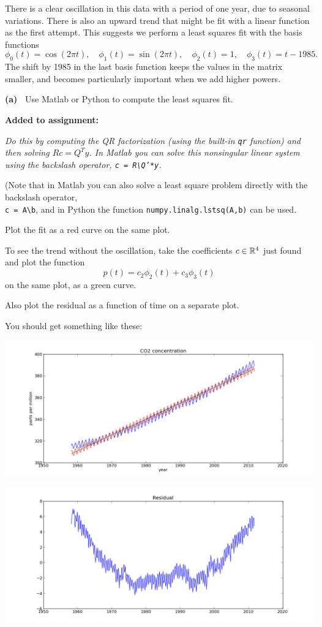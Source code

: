 \documentclass[10pt]{article}
\begin{document}
There is a clear oscillation in this data with a period of one
year, due to seasonal variations.  There is also an upward trend that might
be fit with a linear function as the first attempt.  This suggests we
perform a
least squares fit with the basis functions
\[
\phi_0(t) = \cos(2\pi t), \quad
\phi_1(t) = \sin(2\pi t), \quad
\phi_2(t) = 1, \quad
\phi_3(t) = t-1985. \quad
\]
The shift by 1985 in the last basis function keeps the values in the matrix
smaller, and becomes particularly important when we add higher powers.

{\bf (a)~} 
Use Matlab or Python to compute the least squares fit. 

{\bf Added to assignment:}
{\em 
Do this by computing the QR factorization (using the built-in {\tt qr}
function) and then solving $Rc = Q^Ty$.  In Matlab you can solve this
nonsingular linear system using the backslash operator, 
{\tt c = R\textbackslash Q'*y}.

(Note that in Matlab you can also solve a least square problem directly with
the backslash operator,\\
{\tt c = A\textbackslash b}, 
and in Python the function {\tt numpy.linalg.lstsq(A,b)} can be used.  }

Plot the fit as a red curve on the same plot. 

To see the trend without the oscillation, take the coefficients
$c\in\mathbb{R}^4$ just found and plot the function
\[
p(t) = c_2\phi_2(t) + c_3\phi_3(t) 
\]
on the same plot, as a green curve.  

Also plot the residual as a function of time on a separate plot.

You should get something like these:

\centerline{\includegraphics[width=5.5in]{co2figure1.png}}

\centerline{\includegraphics[width=5.5in]{co2resid1.png}}
\end{document}
